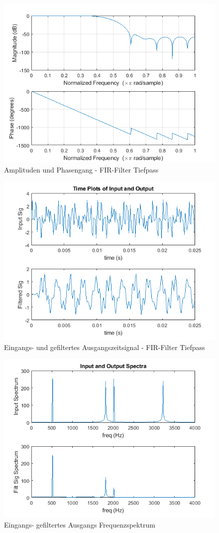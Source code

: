 \begin{figure}[h]
\centering
\includegraphics[width=0.8\linewidth]{Bilder/Attachment_A1_fir_2a_Amplitudengang}
\caption{Amplituden und Phasengang - FIR-Filter Tiefpass}
\label{fig:Attachment_A1_fir_2a_Amplitudengang}
\end{figure}
\newpage

\begin{figure}[h]
\centering
\includegraphics[width=0.6\linewidth]{Bilder/Attachment_A1_fir_2a_Timeplot}
\caption{Eingangs- und gefiltertes Ausgangszeitsignal  - FIR-Filter Tiefpass}
\label{fig:Attachment_A1_fir_2a_Timeplot}
\vspace{-10pt}
\end{figure}

\begin{figure}[h]
\centering
\includegraphics[width=0.6\linewidth]{Bilder/Attachment_A1_fir_2a_Spektrum}
\caption{Eingangs- gefiltertes Ausgangs Frequenzspektrum}
\label{fig:Attachment_A1_fir_2a_Spektrum}
\end{figure}


